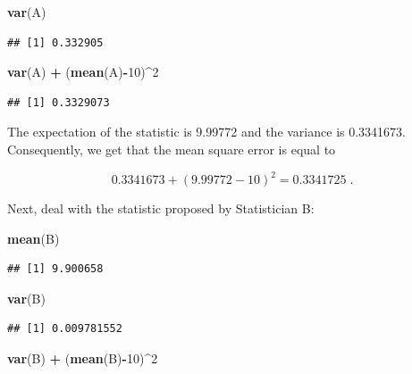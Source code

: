 \documentclass[
]{krantz}
\makeatletter
\newenvironment{Shaded}{\begin{snugshade}}{\end{snugshade}}
\newcommand{\DecValTok}[1]{\textcolor[rgb]{0.00,0.00,0.81}{#1}}
\newcommand{\KeywordTok}[1]{\textcolor[rgb]{0.13,0.29,0.53}{\textbf{#1}}}
\newcommand{\NormalTok}[1]{#1}
\newcommand{\OperatorTok}[1]{\textcolor[rgb]{0.81,0.36,0.00}{\textbf{#1}}}
\newcommand{\StringTok}[1]{\textcolor[rgb]{0.31,0.60,0.02}{#1}}
\newenvironment{kframe}{%
\medskip{}
\setlength{\fboxsep}{.8em}
 \def\at@end@of@kframe{}%
 \ifinner\ifhmode%
  \def\at@end@of@kframe{\end{minipage}}%
  \begin{minipage}{\columnwidth}%
 \fi\fi%
 \def\FrameCommand##1{\hskip\@totalleftmargin \hskip-\fboxsep
 \colorbox{shadecolor}{##1}\hskip-\fboxsep
     \hskip-\linewidth \hskip-\@totalleftmargin \hskip\columnwidth}%
 \MakeFramed {\advance\hsize-\width
   \@totalleftmargin\z@ \linewidth\hsize
   \@setminipage}}%
 {\par\unskip\endMakeFramed%
 \at@end@of@kframe}
\renewenvironment{Shaded}{\begin{kframe}}{\end{kframe}}
\theoremstyle{definition}
\theoremstyle{definition}
\theoremstyle{definition}
\theoremstyle{remark}
\makeatother
\begin{document}
\begin{Shaded}
\begin{Highlighting}[]
\KeywordTok{var}\NormalTok{(A)}
\end{Highlighting}
\end{Shaded}

\begin{verbatim}
## [1] 0.332905
\end{verbatim}

\begin{Shaded}
\begin{Highlighting}[]
\KeywordTok{var}\NormalTok{(A) }\OperatorTok{+}\StringTok{ }\NormalTok{(}\KeywordTok{mean}\NormalTok{(A)}\OperatorTok{-}\DecValTok{10}\NormalTok{)}\OperatorTok{^}\DecValTok{2}
\end{Highlighting}
\end{Shaded}

\begin{verbatim}
## [1] 0.3329073
\end{verbatim}

The expectation of the statistic is 9.99772 and the variance is
0.3341673. Consequently, we get that the mean square error is equal to

\[0.3341673 + (9.99772 - 10)^2 = 0.3341725\;.\]

Next, deal with the statistic proposed by Statistician B:

\begin{Shaded}
\begin{Highlighting}[]
\KeywordTok{mean}\NormalTok{(B)}
\end{Highlighting}
\end{Shaded}

\begin{verbatim}
## [1] 9.900658
\end{verbatim}

\begin{Shaded}
\begin{Highlighting}[]
\KeywordTok{var}\NormalTok{(B)}
\end{Highlighting}
\end{Shaded}

\begin{verbatim}
## [1] 0.009781552
\end{verbatim}

\begin{Shaded}
\begin{Highlighting}[]
\KeywordTok{var}\NormalTok{(B) }\OperatorTok{+}\StringTok{ }\NormalTok{(}\KeywordTok{mean}\NormalTok{(B)}\OperatorTok{-}\DecValTok{10}\NormalTok{)}\OperatorTok{^}\DecValTok{2}
\end{Highlighting}
\end{Shaded}
\end{document}
